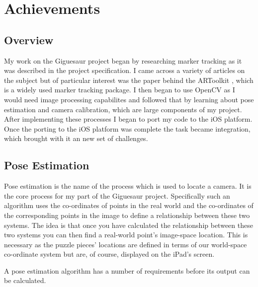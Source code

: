 \documentclass{article}
\begin{document}
\section{Achievements}

\subsection{Overview}

My work on the Giguesaur project began by researching marker tracking as it was described in the project specification. I came across a variety of articles on the subject but of particular interest was the paper behind the ARToolkit \cite{artoolkit}, which is a widely used marker tracking package. I then began to use OpenCV as I would need image processing capabilites and followed that by learning about pose estimation and camera calibration, which are large components of my project. After implementing these processes I began to port my code to the iOS platform. Once the porting to the iOS platform was complete the task became integration, which brought with it an new set of challenges. 

\subsection{Pose Estimation}

Pose estimation is the name of the process which is used to locate a camera. It is the core process for my part of the Giguesaur project. Specifically such an algorithm uses the co-ordinates of points in the real world and the co-ordinates of the corresponding points in the image to define a relationship between these two systems. The idea is that once you have calculated the relationship between these two systems you can then find a real-world point's image-space location. This is necessary as the puzzle pieces' locations are defined in terms of our world-space co-ordinate system but are, of course, displayed on the iPad's screen. 


A pose estimation algorithm has a number of requirements before its output can be calculated. \par
\end{document}
